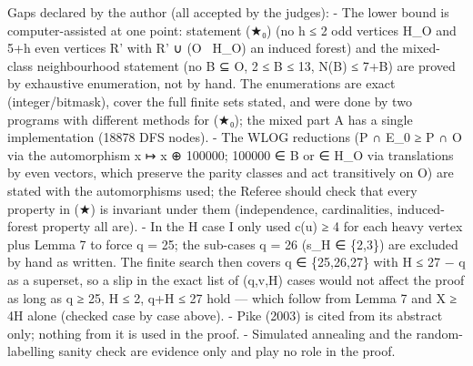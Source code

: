 Gaps declared by the author (all accepted by the judges): - The lower
bound is computer-assisted at one point: statement (★₀) (no h ≤ 2 odd
vertices H\_O and 5+h even vertices R' with R' ∪ (O ~H\_O) an induced
forest) and the mixed-class neighbourhood statement (no B ⊆ O, 2 ≤
\textbar B\textbar{} ≤ 13, \textbar N(B)\textbar{} ≤
7+\textbar B\textbar) are proved by exhaustive enumeration, not by hand.
The enumerations are exact (integer/bitmask), cover the full finite sets
stated, and were done by two programs with different methods for (★₀);
the mixed part A has a single implementation (18878 DFS nodes). - The
WLOG reductions (\textbar P ∩ E\_0\textbar{} ≥ \textbar P ∩ O\textbar{}
via the automorphism x ↦ x ⊕ 100000; 100000 ∈ B or ∈ H\_O via
translations by even vectors, which preserve the parity classes and act
transitively on O) are stated with the automorphisms used; the Referee
should check that every property in (★) is invariant under them
(independence, cardinalities, induced-forest property all are). - In the
\textbar H case I only used c(u) ≥ 4 for each heavy vertex
plus Lemma 7 to force q = 25; the sub-cases q = 26 (s\_H ∈ \{2,3\}) are
excluded by hand as written. The finite search then covers q ∈
\{25,26,27\} with \textbar H\textbar{} ≤ 27 − q as a superset, so a slip
in the exact list of (q,v,\textbar H\textbar) cases would not affect the
proof as long as q ≥ 25, \textbar H\textbar{} ≤ 2,
q+\textbar H\textbar{} ≤ 27 hold --- which follow from Lemma 7 and X ≥
4\textbar H\textbar{} alone (checked case by case above). - Pike (2003)
is cited from its abstract only; nothing from it is used in the proof. -
Simulated annealing and the random-labelling sanity check are evidence
only and play no role in the proof.


